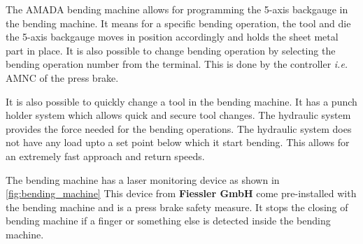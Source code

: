 The AMADA bending machine allows for programming the 5-axis backgauge in the bending machine. It means
for a specific bending operation, the tool and die the 5-axis backgauge
moves in position accordingly and holds the sheet metal part in place. It is also possible to change bending operation by selecting the bending operation number
from the terminal. This is done by the controller \textit{i.e.} AMNC of the press brake.

It is also possible to quickly change a tool in the bending machine. It has a punch holder system  which allows quick and secure tool changes.
The hydraulic system provides the force needed for the bending operations. The hydraulic system does not have any load upto a set point below which
it start bending. This allows for an extremely fast approach and return speeds. \cite{amada-machine}

The bending machine has a laser monitoring device as shown in \ref{fig:bending_machine}
This device from \textbf{Fiessler GmbH} come pre-installed with the bending machine and is a press brake safety measure. It stops the closing of bending machine if a finger or something else is detected
inside the bending machine.

